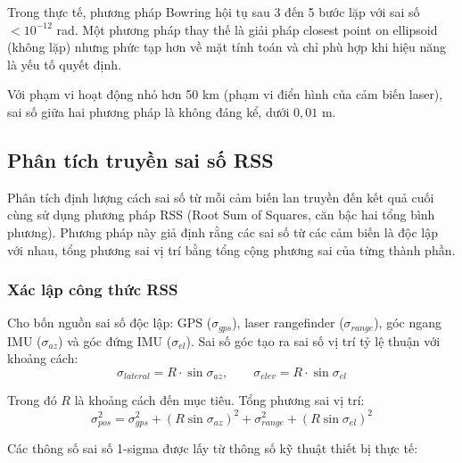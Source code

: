 Trong thực tế, phương pháp Bowring hội tụ sau 3 đến 5 bước lặp với sai số $< 10^{-12}$ rad. Một phương pháp thay thế là giải pháp closest point on ellipsoid (không lặp) nhưng phức tạp hơn về mặt tính toán và chỉ phù hợp khi hiệu năng là yếu tố quyết định.

Với phạm vi hoạt động nhỏ hơn 50 km (phạm vi điển hình của cảm biến laser), sai số giữa hai phương pháp là không đáng kể, dưới $0{,}01$ m.



\subsection{Phân tích truyền sai số RSS}

\hspace{0.5cm} Phân tích định lượng cách sai số từ mỗi cảm biến lan truyền đến kết quả cuối cùng sử dụng phương pháp RSS (Root Sum of Squares, căn bậc hai tổng bình phương). Phương pháp này giả định rằng các sai số từ các cảm biến là độc lập với nhau, tổng phương sai vị trí bằng tổng cộng phương sai của từng thành phần.

\subsubsection{Xác lập công thức RSS}
\hspace{0.5cm} Cho bốn nguồn sai số độc lập: GPS ($\sigma_{gps}$), laser rangefinder ($\sigma_{range}$), góc ngang IMU ($\sigma_{az}$) và góc đứng IMU ($\sigma_{el}$). Sai số góc tạo ra sai số vị trí tỷ lệ thuận với khoảng cách:
\begin{equation}
    \sigma_{lateral} = R \cdot \sin\sigma_{az}, \qquad \sigma_{elev} = R \cdot \sin\sigma_{el}
\end{equation}

Trong đó $R$ là khoảng cách đến mục tiêu. Tổng phương sai vị trí:
\begin{equation}
    \sigma_{pos}^2 = \sigma_{gps}^2 + \left(R\sin\sigma_{az}\right)^2 + \sigma_{range}^2 + \left(R\sin\sigma_{el}\right)^2
\end{equation}

Các thông số sai số 1-sigma được lấy từ thông số kỹ thuật thiết bị thực tế:

\begin{table}[H]
\centering
\caption{Tham số sai số 1-sigma của từng cảm biến}
\label{tab:sensor-params-w3}
\end{table}

